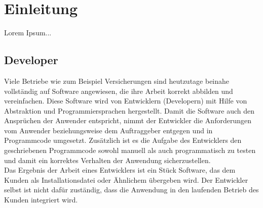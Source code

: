 \chapter{Einleitung}
Lorem Ipsum...

\section{Developer}
Viele Betriebe wie zum Beispiel Versicherungen sind heutzutage beinahe vollständig auf Software angewiesen, die ihre Arbeit korrekt abbilden und vereinfachen. Diese Software wird von Entwicklern (Developern) mit Hilfe von Abstraktion und Programmiersprachen hergestellt. Damit die Software auch den Ansprüchen der Anwender entspricht, nimmt der Entwickler die Anforderungen vom Anwender beziehungsweise dem Auftraggeber entgegen und in Programmcode umgesetzt. Zusätzlich ist es die Aufgabe des Entwicklers den geschriebenen Programmcode sowohl manuell als auch programmatisch zu testen und damit ein korrektes Verhalten der Anwendung sicherzustellen.\\
Das Ergebnis der Arbeit eines Entwicklers ist ein Stück Software, das dem Kunden als Installationsdatei oder Ähnlichem übergeben wird. Der Entwickler selbst ist nicht dafür zuständig, dass die Anwendung in den laufenden Betrieb des Kunden integriert wird.

